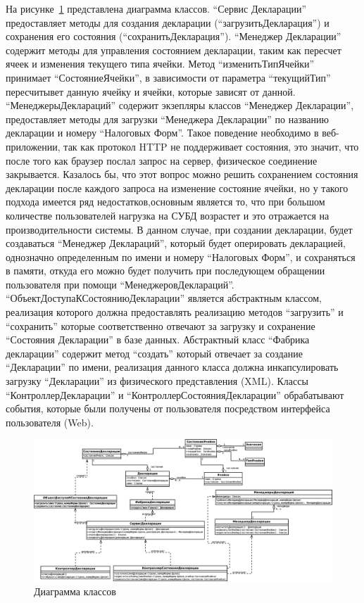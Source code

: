 \documentclass[14pt,a4paper]{reportmod}
\begin{document}
На рисунке~\ref{pic:classes_1} представлена диаграмма классов. ``Сервис Декларации'' предоставляет методы для создания декларации (``загрузитьДекларация'') и сохранения его состояния (``сохранитьДекларация''). ``Менеджер Декларации'' содержит методы для управления состоянием декларации, таким как пересчет ячеек и изменения текущего типа ячейки. Метод ``изменитьТипЯчейки'' принимает ``СостояниеЯчейки'', в зависимости от параметра ``текущийТип'' пересчитывет данную ячейку и ячейки, которые зависят от данной. ``МенеджерыДеклараций'' содержит экзепляры классов ``Менеджер Декларации'', предоставляет методы для загрузки ``Менеджера Декларации'' по названию декларации и номеру ``Налоговых Форм''. Такое поведение необходимо в веб-приложении, так как протокол HTTP не поддерживает состояния, это значит, что после того как браузер послал запрос на сервер, физическое соединение закрывается. Казалось бы, что этот вопрос можно решить сохранением состояния декларации после каждого запроса на изменение состояние ячейки, но у такого подхода имеется ряд недостатков,основным является то, что при большом количестве пользователей нагрузка на СУБД возрастет и это отражается на производительности системы. В данном случае, при создании декларации, будет создаваться ``Менеджер Деклараций'', который будет оперировать декларацией, однозначно определенным по имени и номеру ``Налоговых Форм'', и сохраняться в памяти, откуда его можно будет получить при последующем обращении пользователя при помощи ``МенеджеровДеклараций''. ``ОбъектДоступаКСостояниюДекларации'' является абстрактным классом, реализация которого должна предоставлять реализацию методов ``загрузить'' и ``сохранить'' которые соответственно отвечают за загрузку и сохранение ``Состояния Декларации'' в базе данных. Абстрактный класс ``Фабрика декларации'' содержит метод ``создать'' который отвечает за создание ``Декларации'' по имени, реализация данного класса должна инкапсулировать загрузку ``Декларации'' из физического представления (XML). Классы ``КонтроллерДекларации'' и ``КонтроллерСостоянияДекларации'' обрабатывают события, которые были получены от пользователя посредством интерфейса пользователя (Web).
\begin{figure}
  \centering
  \includegraphics[scale=0.3]{uml/classes_1}
  \caption{Диаграмма классов}
  \label{pic:classes_1}
\end{figure}
\end{document}
